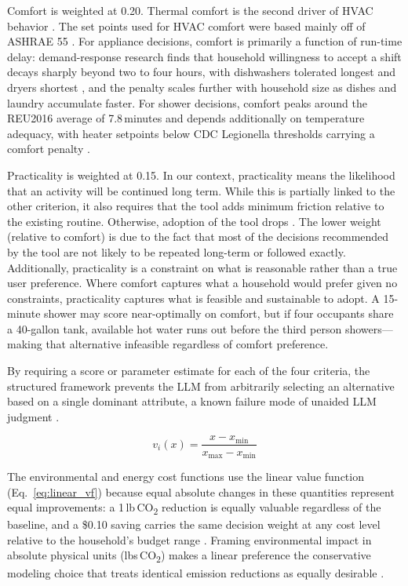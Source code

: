 \documentclass[a4paper,fleqn]{cas-dc}
\begin{document}
Comfort is weighted at 0.20. Thermal comfort is the second driver of HVAC behavior \citep{aqilah2022,karjalainen2007}. The set points used for HVAC comfort were based mainly off of ASHRAE 55 \citep{ashrae55,dedear2002}. For appliance decisions, comfort is primarily a function of run-time delay: demand-response research finds that household willingness to accept a shift decays sharply beyond two to four hours, with dishwashers tolerated longest and dryers shortest \citep{paetz2012,waseem2020}, and the penalty scales further with household size as dishes and laundry accumulate faster. For shower decisions, comfort peaks around the REU2016 average of 7.8\,minutes \citep{reu2016,harrispoll2024} and depends additionally on temperature adequacy, with heater setpoints below CDC Legionella thresholds carrying a comfort penalty \citep{cdc2026}.

Practicality is weighted at 0.15. In our context, practicality means the likelihood that an activity will be continued long term. While this is partially linked to the other criterion, it also requires that the tool adds minimum friction relative to the existing routine. Otherwise, adoption of the tool drops \citep{ariely2001,leclerc1995,gardner2020,mergelsberg2020}. The lower weight (relative to comfort) is due to the fact that most of the decisions recommended by the tool are not likely to be repeated long-term or followed exactly. Additionally, practicality is a constraint on what is reasonable rather than a true user preference. Where comfort captures what a household would prefer given no constraints, practicality captures what is feasible and sustainable to adopt. A 15-minute shower may score near-optimally on comfort, but if four occupants share a 40-gallon tank, available hot water runs out before the third person showers---making that alternative infeasible regardless of comfort preference.

By requiring a score or parameter estimate for each of the four criteria, the structured framework prevents the LLM from arbitrarily selecting an alternative based on a single dominant attribute, a known failure mode of unaided LLM judgment \citep{wang2024fairescalers}.

\begin{equation}
\label{eq:linear_vf}
v_i(x) = \frac{x - x_{\min}}{x_{\max} - x_{\min}}
\end{equation}

The environmental and energy cost functions use the linear value function (Eq.~\ref{eq:linear_vf}) because equal absolute changes in these quantities represent equal improvements: a 1\,lb\,CO\textsubscript{2} reduction is equally valuable regardless of the baseline, and a \$0.10 saving carries the same decision weight at any cost level relative to the household's budget range \citep{dyer1979,keeneyraiffa1976}. Framing environmental impact in absolute physical units (lbs\,CO\textsubscript{2}) makes a linear preference the conservative modeling choice that treats identical emission reductions as equally desirable \citep{keeneyraiffa1976}.
\end{document}
